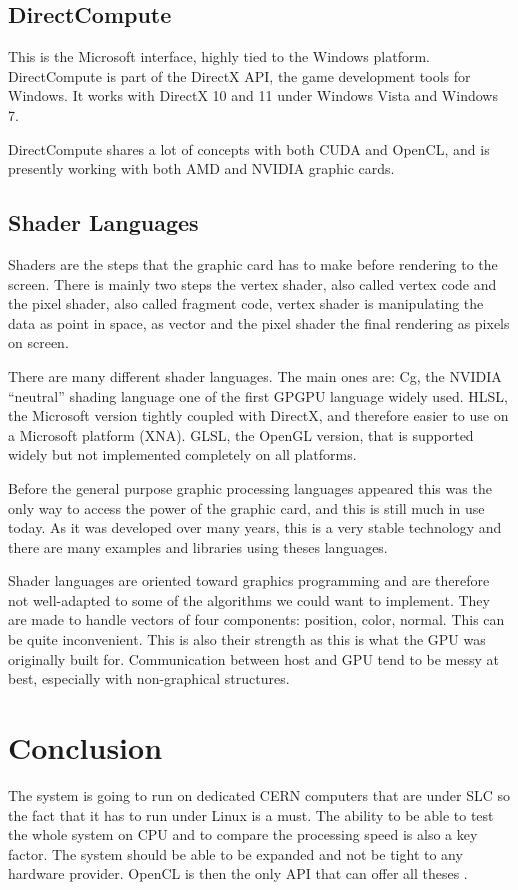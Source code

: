 \subsection{DirectCompute}

This is the Microsoft interface, highly tied to the Windows platform. DirectCompute is part of the DirectX API, the game development tools for Windows. It works with DirectX 10 and 11 under Windows Vista and Windows 7. 

DirectCompute shares a lot of concepts with both \gls{CUDA} and \gls{OpenCL}, and is presently working with both AMD and NVIDIA graphic cards.

\subsection{Shader Languages}

Shaders are the steps that the graphic card has to make before rendering to the screen. There is mainly two steps the vertex shader, also called vertex code and the pixel shader, also called fragment code, vertex shader is manipulating the data as point in space, as vector and the pixel shader the final rendering as pixels on screen.

There are many different shader languages. The main ones are: Cg, the NVIDIA “neutral” shading language one of the first \gls{GPGPU} language widely used. \Gls{HLSL}, the Microsoft version tightly coupled with DirectX, and therefore easier to use on a Microsoft platform (XNA). \Gls{GLSL}, the \gls{OpenGL} version, that is supported widely but not implemented completely on all platforms.

Before the general purpose graphic processing languages appeared this was the only way to access the power of the graphic card, and this is still much in use today. As it was developed over many years, this is a very stable technology and there are many examples and libraries using theses languages.

Shader languages are oriented toward graphics programming and are therefore not well-adapted to some of the algorithms we could want to implement. They are made to handle vectors of four components: position, color, normal. This can be quite inconvenient. This is also their strength as this is what the \gls{GPU} was originally built for. Communication between host and \gls{GPU} tend to be messy at best, especially with non-graphical structures.

\section{Conclusion}

The system is going to run on dedicated \gls{CERN} computers that are under \gls{SLC} so the fact that it has to run under Linux is a must. The ability to be able to test the whole system on CPU and to compare the processing speed is also a key factor. The system should be able to be expanded and not be tight to any hardware provider. \Gls{OpenCL} is then the only \gls{API} that can offer all theses .